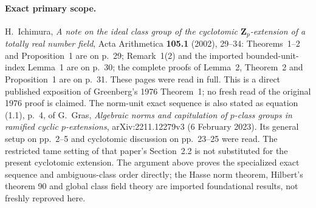\paragraph{Exact primary scope.}
H.~Ichimura, \emph{A note on the ideal class group of the
cyclotomic $\mathbf Z_p$-extension of a totally real number
field}, Acta Arithmetica \textbf{105.1} (2002), 29--34:
Theorems~1--2 and Proposition~1 are on p.~29;
Remark~1(2) and the imported bounded-unit-index Lemma~1 are on
p.~30; the complete proofs of Lemma~2, Theorem~2 and
Proposition~1 are on p.~31.  These pages were read in full.
This is a direct published exposition of Greenberg's
1976 Theorem~1; no fresh read of the original 1976 proof is
claimed.  The norm-unit exact sequence is also stated as
equation (1.1), p.~4, of G.~Gras,
\emph{Algebraic norms and capitulation of $p$-class groups in
ramified cyclic $p$-extensions}, arXiv:2211.12279v3
(6 February 2023).  Its general setup on pp.~2--5 and
cyclotomic discussion on pp.~23--25 were read.
The restricted tame setting of that paper's Section~2.2 is
not substituted for the present cyclotomic extension.
The argument above proves the specialized exact sequence and
ambiguous-class order directly; the Hasse norm theorem,
Hilbert's theorem 90 and global class field theory are imported
foundational results, not freshly reproved here.
